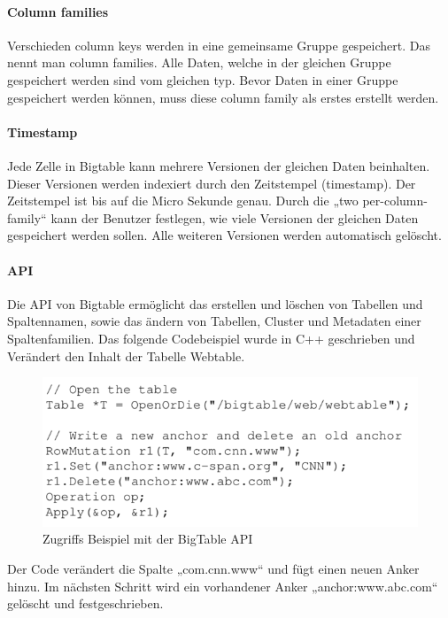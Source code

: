 \paragraph{Column families}
Verschieden column keys werden in eine gemeinsame Gruppe gespeichert. Das nennt man column families. Alle Daten, welche in der gleichen Gruppe gespeichert werden sind vom gleichen typ. Bevor Daten in einer Gruppe gespeichert werden können, muss diese column family als erstes erstellt werden.

\paragraph{Timestamp}
Jede Zelle in Bigtable kann mehrere Versionen der gleichen Daten beinhalten. Dieser Versionen werden indexiert durch den Zeitstempel (timestamp). Der Zeitstempel ist bis auf die Micro Sekunde genau. Durch die „two per-column-family“ kann der Benutzer festlegen, wie viele Versionen der gleichen Daten gespeichert werden sollen. Alle weiteren Versionen werden automatisch gelöscht.

\paragraph{API}
Die API von Bigtable ermöglicht das erstellen und löschen von Tabellen und Spaltennamen, sowie das ändern von Tabellen, Cluster und Metadaten einer Spaltenfamilien. Das folgende Codebeispiel wurde in C++ geschrieben und Verändert den Inhalt der Tabelle Webtable. 

\begin{figure}[!htpb]
	\centering
	\includegraphics[]{pics/bigtable_api.png}
	\caption {Zugriffs Beispiel mit der BigTable API}	
\end{figure}

Der Code verändert die Spalte „com.cnn.www“ und fügt einen neuen Anker hinzu. Im nächsten Schritt wird ein vorhandener Anker „anchor:www.abc.com“ gelöscht und festgeschrieben.


